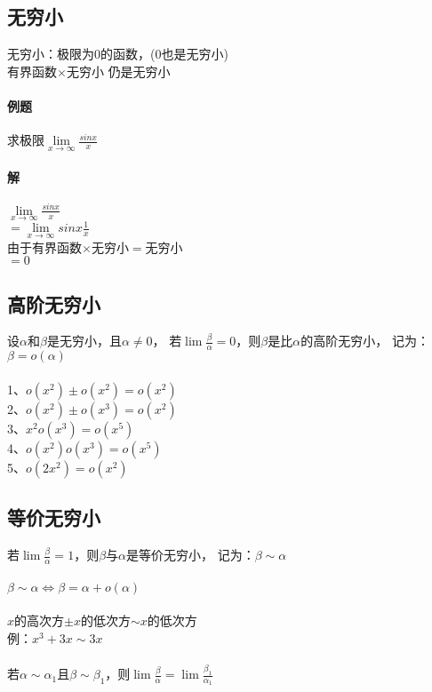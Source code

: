 \documentclass{article}
\begin{document}
\begin{flushleft}
	\section{无穷小}
	
	无穷小：极限为0的函数，(0也是无穷小)\\
	有界函数$\times$无穷小 仍是无穷小\\
	
	\paragraph{例题}
	求极限$\lim\limits_{x\to \infty}\frac{sinx}{x}$
	\paragraph{解}
	$\lim\limits_{x\to \infty}\frac{sinx}{x}$\\
	$=\lim\limits_{x\to \infty}sinx\frac{1}{x}$\\
	由于有界函数$\times$无穷小$=$无穷小\\
	$=0$\\
	
	\subsection{高阶无穷小}
	设$\alpha$和$\beta$是无穷小，且$\alpha \neq 0$，
	若$\lim \frac{\beta}{\alpha}=0$，则$\beta$是比$\alpha$的高阶无穷小，
	记为：$\beta = o(\alpha)$\\
	~\\
	1、$o(x^2)\pm o(x^2)=o(x^2)$\\
	2、$o(x^2)\pm o(x^3)=o(x^2)$\\
	3、$x^2 o(x^3)=o(x^5)$\\
	4、$o(x^2) o(x^3)=o(x^5)$\\
	5、$o(2x^2)=o(x^2)$\\
	
	\subsection{等价无穷小}
	
	若$\lim \frac{\beta}{\alpha}=1$，则$\beta$与$\alpha$是等价无穷小，
	记为：$\beta \sim \alpha$\\
	~\\
	$\beta \sim \alpha \Leftrightarrow \beta = \alpha + o(\alpha)$\\
	~\\
	$x$的高次方$\pm x$的低次方$\sim x$的低次方\\
	\qquad 例：$x^3+3x\sim 3x$\\
	~\\
	若$\alpha \sim \alpha_1$且$\beta \sim \beta_1$，则$\lim \frac{\beta}{\alpha} = \lim \frac{\beta_1}{\alpha_1}$\\
	

\end{flushleft}
\end{document}
